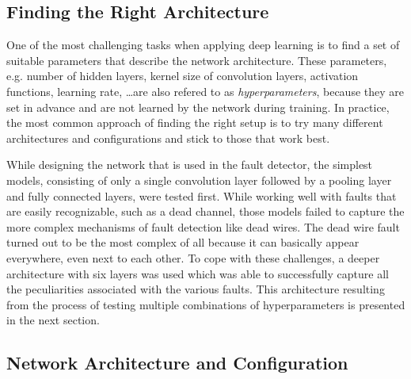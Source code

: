 \subsection{Finding the Right Architecture}

One of the most challenging tasks when applying deep learning is to
find a set of suitable parameters that describe the network
architecture. These parameters, e.g. number of hidden layers, kernel
size of convolution layers, activation functions, learning rate,
\ldots are also refered to as \textit{hyperparameters}, because they
are set in advance and are not learned by the network during training.
In practice, the most common approach of finding the right
setup is to try many different architectures and configurations
and stick to those that work best.

While designing the network that is used in the fault detector, the
simplest models, consisting of only a single convolution layer
followed by a pooling layer and fully connected layers, were tested
first. While working well with faults that are easily recognizable,
such as a dead channel, those models failed to capture the more
complex mechanisms of fault detection like dead wires. The dead wire
fault turned out to be the most complex of all because it
can basically appear everywhere, even next to each other. To cope with
these challenges, a deeper
architecture with six layers was used which was able to successfully
capture all the peculiarities associated with the various faults. This
architecture resulting from the process of testing multiple
combinations of hyperparameters is presented in the next section.

\subsection{Network Architecture and Configuration}

